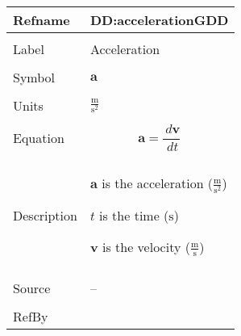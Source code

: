 \documentclass[12pt]{article}
\begin{document}
\vspace{\baselineskip}
\noindent
\begin{minipage}{\textwidth}
\begin{tabular}{>{\raggedright}p{}>{\raggedright\arraybackslash}p{}}
\toprule \textbf{Refname} & \textbf{DD:accelerationGDD}
\label{DD:accelerationGDD}
\\ \midrule \\
Label & Acceleration
        
\\ \midrule \\
Symbol & $\symbf{a}$
         
\\ \midrule \\
Units & $\frac{\text{m}}{\text{s}^{2}}$
        
\\ \midrule \\
Equation & \begin{displaymath}
           \symbf{a}=\frac{\,d\symbf{v}}{\,dt}
           \end{displaymath}
\\ \midrule \\
Description & \begin{symbDescription}
              \item{$\symbf{a}$ is the acceleration ($\frac{\text{m}}{\text{s}^{2}}$)}
              \item{$t$ is the time (${\text{s}}$)}
              \item{$\symbf{v}$ is the velocity ($\frac{\text{m}}{\text{s}}$)}
              \end{symbDescription}
\\ \midrule \\
Source & --
         
\\ \midrule \\
RefBy & 
\\ \bottomrule
\end{tabular}
\end{minipage}
\end{document}
